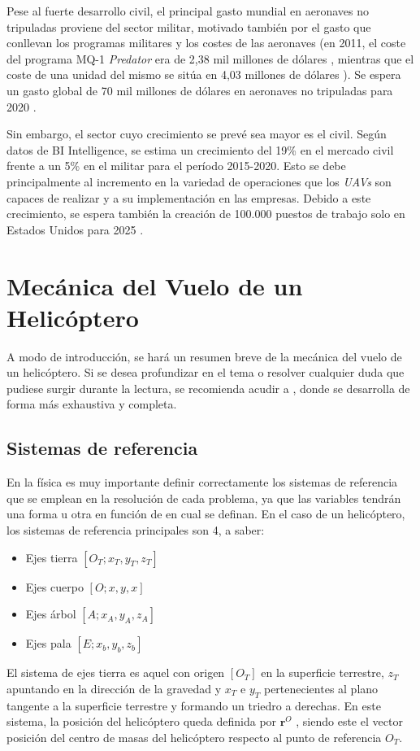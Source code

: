 Pese al fuerte desarrollo civil, el principal gasto mundial en aeronaves no tripuladas proviene del sector militar, motivado también por el gasto que conllevan los programas militares y los costes de las aeronaves (en 2011, el coste del programa MQ-1 \emph{Predator} era de 2,38 mil millones de dólares \citep{Predatorunitbudget}, mientras que el coste de una unidad del mismo se sitúa en 4,03 millones de dólares \citep{Predatorprogrambudget}). Se espera un gasto global de 70 mil millones de dólares en aeronaves no tripuladas para 2020 \citep{Goldman}.

Sin embargo, el sector cuyo crecimiento se prevé sea mayor es el civil. Según datos de BI Intelligence, se estima un crecimiento del 19\% en el mercado civil frente a un 5\% en el militar para el período 2015-2020.
Esto se debe principalmente al incremento en la variedad de operaciones que los \emph{UAVs} son capaces de realizar y a su implementación en las empresas. Debido a este crecimiento, se espera también la creación de 100.000 puestos de trabajo solo en Estados Unidos para 2025 \citep{AUVSI}.

\section{Mecánica del Vuelo de un Helicóptero}
A modo de introducción, se hará un resumen breve de la mecánica del vuelo de un helicóptero. Si se desea profundizar en el tema o resolver cualquier duda que pudiese surgir durante la lectura, se recomienda acudir a \citet{Cuerva}, donde se desarrolla de forma más exhaustiva y completa.

\subsection{Sistemas de referencia}
En la física es muy importante definir correctamente los sistemas de referencia que se emplean en la resolución de cada problema, ya que las variables tendrán una forma u otra en función de en cual se definan.
En el caso de un helicóptero, los sistemas de referencia principales son 4, a saber:
\begin{itemize}
	\item Ejes tierra $[O_{T};x_{T},y_{T},z_{T}]$
	\item Ejes cuerpo $[O;x,y,x]$
	\item Ejes árbol $[A;x_{A},y_{A},z_{A}]$
	\item Ejes pala $[E;x_{b},y_{b},z_{b}]$
\end{itemize}
El sistema de ejes tierra es aquel con origen $[O_{T}]$ en la superficie terrestre, $z_{T}$ apuntando en la dirección de la gravedad y $x_{T}$ e $y_{T}$ pertenecientes al plano tangente a la superficie terrestre y formando un triedro a derechas. En este sistema, la posición del helicóptero queda definida por $\textbf{r}^{O}$ , siendo este el vector posición del centro de masas del helicóptero respecto al punto de referencia $O_{T}$.

